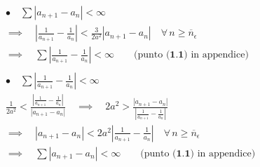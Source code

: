 \documentclass[11pt,reqno]{amsart}
\begin{document}
\begin{gather*}
 \bullet \quad \sum |a_{n+1} - a_n| < \infty\\
 \implies \quad \left|\frac{1}{a_{n+1}}-\frac{1}{a_n}\right| < \frac{3}{2a^2}|a_{n+1} - a_n| \quad \forall \, n \geq \overline{n}_{\epsilon}\\ \implies \quad \sum \left|\frac{1}{a_{n+1}}-\frac{1}{a_n}\right| < \infty \quad \quad \text{(punto } \textbf{(1.1)} \text{ in appendice)}\\\\
 \bullet \quad \sum \left|\frac{1}{a_{n+1}}-\frac{1}{a_n}\right| < \infty\\
 \frac{1}{2a^2} < \frac{\left|\frac{1}{a_{n+1}}-\frac{1}{a_n}\right|}{|a_{n+1} - a_n|} \quad \implies \quad 2a^2 > \frac{|a_{n+1} - a_n|}{\left|\frac{1}{a_{n+1}}-\frac{1}{a_n}\right|}\\
 \implies \quad |a_{n+1} - a_n| < 2a^2\left|\frac{1}{a_{n+1}}-\frac{1}{a_n}\right| \quad \forall \, n \geq \overline{n}_{\epsilon}\\
 \implies \quad \sum |a_{n+1} - a_n| < \infty \quad \quad \text{(punto } \textbf{(1.1)} \text{ in appendice)}\\
\end{gather*}
\fi
\end{document}
